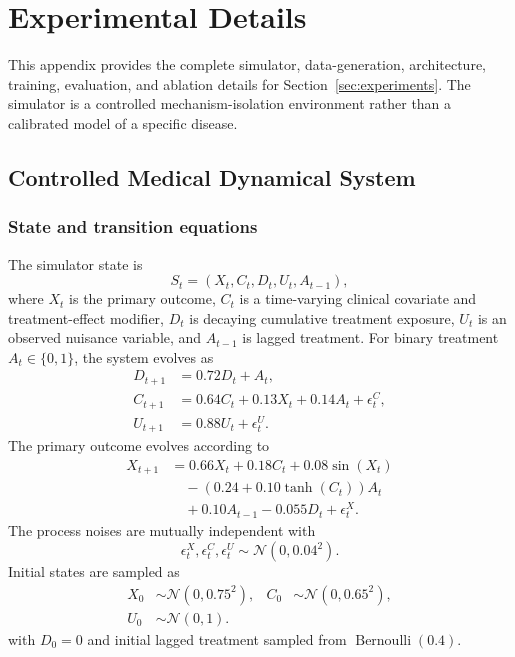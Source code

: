 \appendix

\section{Experimental Details}
\label{app:experimental-details}

This appendix provides the complete simulator, data-generation,
architecture, training, evaluation, and ablation details for
Section~\ref{sec:experiments}. The simulator is a controlled
mechanism-isolation environment rather than a calibrated model of a
specific disease.

\subsection{Controlled Medical Dynamical System}
\label{app:simulator}

\subsubsection{State and transition equations}

The simulator state is
\begin{equation}
    S_t=(X_t,C_t,D_t,U_t,A_{t-1}),
\end{equation}
where $X_t$ is the primary outcome, $C_t$ is a time-varying
clinical covariate and treatment-effect modifier, $D_t$ is decaying
cumulative treatment exposure, $U_t$ is an observed nuisance variable,
and $A_{t-1}$ is lagged treatment. For binary treatment
$A_t\in\{0,1\}$, the system evolves as
\begin{align}
    D_{t+1}
    &=0.72D_t+A_t,
    \label{eq:app-dose}\\
    C_{t+1}
    &=0.64C_t+0.13X_t+0.14A_t+\epsilon_t^C,
    \label{eq:app-covariate}\\
    U_{t+1}
    &=0.88U_t+\epsilon_t^U.
    \label{eq:app-nuisance}
\end{align}
The primary outcome evolves according to
\begin{align}
    X_{t+1}
    &=0.66X_t+0.18C_t+0.08\sin(X_t) \nonumber\\
    &\quad-\left(0.24+0.10\tanh(C_t)\right)A_t \nonumber\\
    &\quad+0.10A_{t-1}-0.055D_t+\epsilon_t^X.
    \label{eq:app-outcome}
\end{align}
The process noises are mutually independent with
\begin{equation}
    \epsilon_t^X,\epsilon_t^C,\epsilon_t^U
    \sim\mathcal N(0,0.04^2).
\end{equation}
Initial states are sampled as
\begin{align}
    X_0&\sim\mathcal N(0,0.75^2), &
    C_0&\sim\mathcal N(0,0.65^2),\\
    U_0&\sim\mathcal N(0,1).&&
\end{align}
with $D_0=0$ and initial lagged treatment sampled from
$\operatorname{Bernoulli}(0.4)$.


